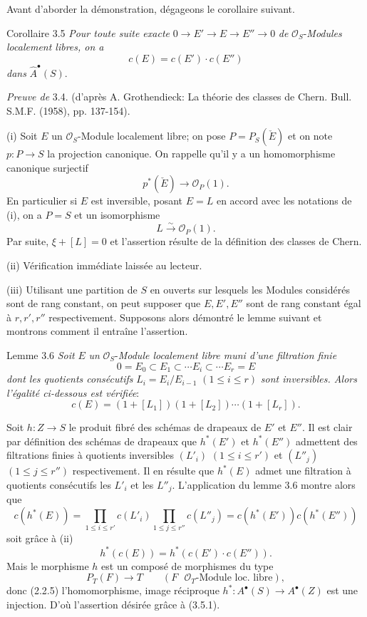 Avant d'aborder la démonstration, dégageons le corollaire suivant.

\begin{statement}{Corollaire 3.5}
\emph{Pour toute suite exacte} $0\to E'\to E\to E''\to0$ \emph{de} $\mathcal{O}_S$-\emph{Modules localement libres, on a}
\[
c(E)=c(E')\cdot c(E'')
\]
\emph{dans} $\widehat A^{\bullet}(S)$.
\end{statement}

\emph{Preuve de} 3.4. (d'après A. Grothendieck: La théorie des classes de Chern. Bull. S.M.F. (1958), pp. 137-154).

(i)
Soit $E$ un $\mathcal{O}_S$-Module localement libre; on pose $P=P_S(\check E)$ et on note $p:P\to S$ la projection canonique. On rappelle qu'il y a un homomorphisme canonique surjectif
\[
p^*(\check E)\longrightarrow \mathcal{O}_P(1).
\]
En particulier si $E$ est inversible, posant $E=L$ en accord avec les notations de (i), on a $P=S$ et un isomorphisme
\[
L\xrightarrow{\sim}\mathcal{O}_P(1).
\]
Par suite, $\xi+[L]=0$ et l'assertion résulte de la définition des classes de Chern.

(ii) Vérification immédiate laissée au lecteur.

(iii) Utilisant une partition de $S$ en ouverts sur lesquels les Modules considérés sont de rang constant, on peut supposer que $E,E',E''$ sont de rang constant égal à $r,r',r''$ respectivement. Supposons alors démontré le lemme suivant et montrons comment il entraîne l'assertion.

\begin{statement}{Lemme 3.6}
\emph{Soit} $E$ \emph{un} $\mathcal{O}_S$-\emph{Module localement libre muni d'une filtration finie}
\[
0=E_0\subset E_1\subset\cdots E_i\subset\cdots E_r=E
\]
\emph{dont les quotients consécutifs} $L_i=E_i/E_{i-1}$ $(1\le i\le r)$ \emph{sont inversibles. Alors l'égalité ci-dessous est vérifiée}:
\[
c(E)=(1+[L_1])(1+[L_2])\cdots(1+[L_r]).
\]
\end{statement}

Soit $h:Z\to S$ le produit fibré des schémas de drapeaux de $E'$ et $E''$. Il est clair par définition des schémas de drapeaux que $h^*(E')$ et $h^*(E'')$ admettent des filtrations finies à quotients inversibles $(L'_i)$ $(1\le i\le r')$ et $(L''_j)$ $(1\le j\le r'')$ respectivement. Il en résulte que $h^*(E)$ admet une filtration à quotients consécutifs les $L'_i$ et les $L''_j$. L'application du lemme 3.6 montre alors que
\[
c(h^*(E))=
\prod_{1\le i\le r'}c(L'_i)\prod_{1\le j\le r''}c(L''_j)
=c(h^*(E'))c(h^*(E''))
\]
soit grâce à (ii)
\[
h^*(c(E))=h^*(c(E')\cdot c(E'')).
\tag{3.5.1.}
\]
Mais le morphisme $h$ est un composé de morphismes du type
\[
P_T(F)\longrightarrow T
\qquad (F\text{ }\mathcal{O}_T\text{-Module loc. libre}),
\]
donc (2.2.5) l'homomorphisme, image réciproque $h^*:A^{\bullet}(S)\to A^{\bullet}(Z)$ est une injection. D'où l'assertion désirée grâce à (3.5.1).

